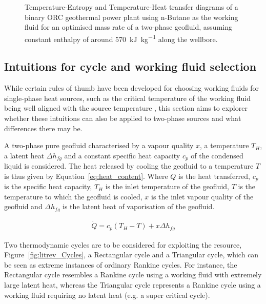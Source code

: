              \begin{figure}[H]
                \centering
                
                \caption[TS and TQ diagrams of a binary \ac{ORC} geothermal power plant with optimised geofluid working fluid mass rate ratio]{Temperature-Entropy and Temperature-Heat transfer diagrams of a binary \ac{ORC} geothermal power plant using n-Butane as the working fluid for an optimised mass rate of a two-phase geofluid, assuming constant enthalpy of around \qty{570}{\kilo\joule\per\kg} along the wellbore.}
                \label{fig:litrev_ORC_Vap_Mrat_opts_TS}
            \end{figure}

    \subsection{Intuitions for cycle and working fluid selection}
        \label{sec:prosim_litrev_orc_efficiency}

        While certain rules of thumb have been developed for choosing working fluids for single-phase heat sources, such as the critical temperature of the working fluid being well aligned with the source temperature \cite{Astolfi2014B}, this section aims to explorer whether these intuitions can also be applied to two-phase sources and what differences there may be. 
        
        A two-phase pure geofluid characterised by a vapour quality \(x\), a temperature \(T_H\), a latent heat \(\Delta h_{fg}\) and a constant specific heat capacity \(c_p\) of the condensed liquid is considered. The heat released by cooling the geofluid to a temperature \(T\) is thus given by Equation~\ref{eq:heat_content}. Where \(\Dot{Q}\) is the heat transferred, \(c_p\) is the specific heat capacity, \(T_H\) is the inlet temperature of the geofluid, \(T\) is the temperature to which the geofluid is cooled, \(x\) is the inlet vapour quality of the geofluid and \(\Delta h_{fg}\) is the latent heat of vaporisation of the geofluid.

        \begin{align}
            \Dot{Q} = c_p (T_H - T) + x\Delta h_{fg} \label{eq:heat_content}
        \end{align}

        Two thermodynamic cycles are to be considered for exploiting the resource, Figure~\ref{fig:litrev_Cycles}, a Rectangular cycle and a Triangular cycle, which can be seen as extreme instances of ordinary Rankine cycles. For instance, the Rectangular cycle resembles a Rankine cycle using a working fluid with extremely large latent heat, whereas the Triangular cycle represents a Rankine cycle using a working fluid requiring no latent heat (e.g. a super critical cycle). 

